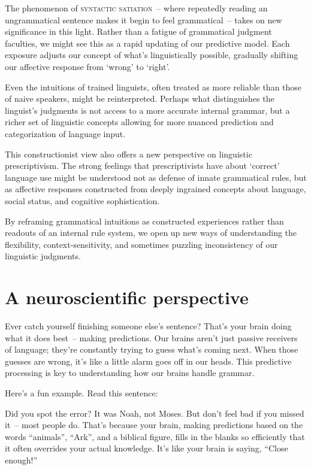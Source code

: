 The phenomenon of \textsc{syntactic satiation}~-- where repeatedly reading an ungrammatical sentence makes it begin to feel grammatical~-- takes on new significance in this light. Rather than a fatigue of grammatical judgment faculties, we might see this as a rapid updating of our predictive model. Each exposure adjusts our concept of what's linguistically possible, gradually shifting our affective response from `wrong' to `right'.

Even the intuitions of trained linguists, often treated as more reliable than those of naive speakers, might be reinterpreted. Perhaps what distinguishes the linguist's judgments is not access to a more accurate internal grammar, but a richer set of linguistic concepts allowing for more nuanced prediction and categorization of language input.

This constructionist view also offers a new perspective on linguistic prescriptivism. The strong feelings that prescriptivists have about `correct' language use might be understood not as defense of innate grammatical rules, but as affective responses constructed from deeply ingrained concepts about language, social status, and cognitive sophistication.

By reframing grammatical intuitions as constructed experiences rather than readouts of an internal rule system, we open up new ways of understanding the flexibility, context-sensitivity, and sometimes puzzling inconsistency of our linguistic judgments.

\section{A neuroscientific perspective}

Ever catch yourself finishing someone else's sentence? That's your brain doing what it does best~-- making predictions. Our brains aren't just passive receivers of language; they're constantly trying to guess what's coming next. When those guesses are wrong, it's like a little alarm goes off in our heads. This predictive processing is key to understanding how our brains handle grammar.

Here's a fun example. Read this sentence:

\label{ex:moses}
\z

Did you spot the error? It was Noah, not Moses. But don't feel bad if you missed it~-- most people do. That's because your brain, making predictions based on the words ``animals'', ``Ark'', and a biblical figure, fills in the blanks so efficiently that it often overrides your actual knowledge. It's like your brain is saying, ``Close enough!''

